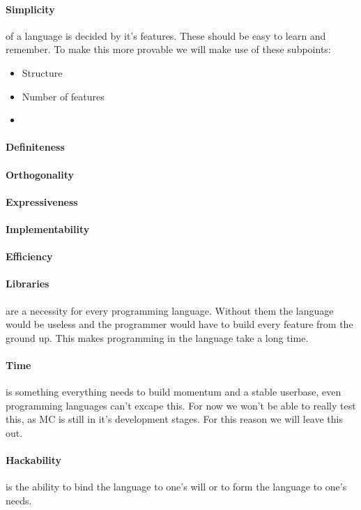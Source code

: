 \paragraph{Simplicity}
of a language is decided by it's features. These should be easy to learn and remember. To make this more provable we will make use of these subpoints:
\begin{itemize}
  \item Structure
  \item Number of features
    \item 
\end{itemize}
\paragraph{Definiteness}
\paragraph{Orthogonality}
\paragraph{Expressiveness}
\paragraph{Implementability}
\paragraph{Efficiency}

\paragraph{Libraries}
are a necessity for every programming language. Without them the language would be useless and the programmer would have to build every feature from the ground up. This makes programming in the language take a long time.

\paragraph{Time}
is something everything needs to build momentum and a stable userbase, even programming languages can't excape this. For now we won't be able to really test this, as MC is still in it's development stages. For this reason we will leave this out.
\paragraph{Hackability}
is the ability to bind the language to one's will or to form the language to one's needs. 
